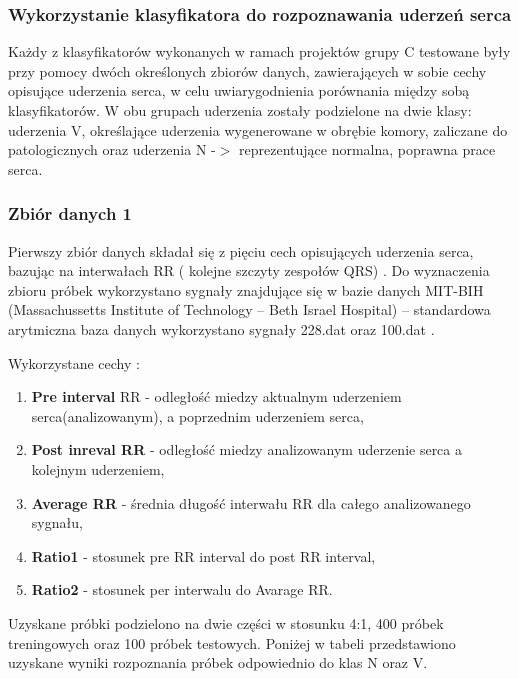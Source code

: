 \documentclass[[10pt,a4paper]{article}
\begin{document}
\begin{enumerate}
\noindent 

\noindent 

\subsubsection{Wykorzystanie klasyfikatora do rozpoznawania uderzeń serca}

\noindent Każdy z klasyfikatorów wykonanych w ramach projektów grupy C testowane były przy pomocy dwóch określonych zbiorów danych, zawierających w sobie cechy opisujące uderzenia serca, w celu uwiarygodnienia porównania między sobą klasyfikatorów. W obu grupach uderzenia zostały podzielone na dwie klasy: uderzenia V, określające uderzenia wygenerowane w obrębie komory, zaliczane do patologicznych oraz uderzenia N -$>$ reprezentujące normalna, poprawna prace serca.

\subsubsection{ Zbiór danych 1}

\noindent Pierwszy zbiór danych składał się z pięciu cech opisujących uderzenia serca, bazując na interwałach RR ( kolejne szczyty zespołów QRS) . Do wyznaczenia zbioru próbek wykorzystano sygnały znajdujące się w bazie danych MIT-BIH (Massachussetts Institute of Technology -- Beth Israel Hospital) -- standardowa arytmiczna baza danych wykorzystano sygnały 228.dat oraz 100.dat .

\noindent Wykorzystane cechy : 

\begin{enumerate}
\item  \textbf{Pre interval} RR - odległość miedzy aktualnym uderzeniem serca(analizowanym), a poprzednim uderzeniem serca,

\item  \textbf{Post inreval RR} - odległość miedzy analizowanym uderzenie serca a kolejnym uderzeniem,

\item  \textbf{Average RR} - średnia długość interwału RR dla całego analizowanego sygnału,

\item  \textbf{Ratio1} - stosunek pre RR interval do post RR interval,

\item  \textbf{Ratio2 }- stosunek per interwalu do Avarage RR.
\end{enumerate}

\noindent Uzyskane próbki podzielono na dwie części w stosunku 4:1, 400 próbek treningowych oraz 100 próbek testowych. Poniżej w tabeli przedstawiono uzyskane wyniki rozpoznania próbek odpowiednio do klas N oraz V.


\end{enumerate}
\end{document}
